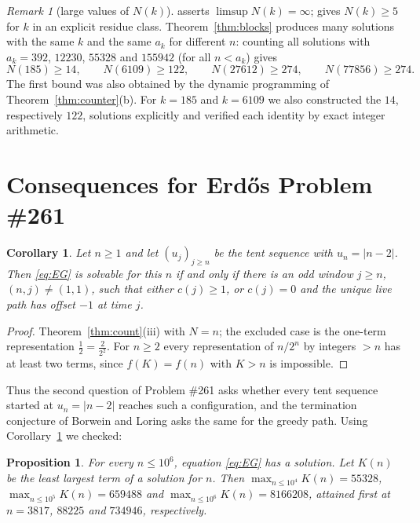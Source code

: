 \documentclass[11pt]{amsart}
\newtheorem{proposition}[theorem]{Proposition}
\newtheorem{corollary}[theorem]{Corollary}
\theoremstyle{definition}
\theoremstyle{remark}
\newtheorem{remark}[theorem]{Remark}
\begin{document}
\begin{remark}[large values of $N(k)$]
\cite[Conj.~3.3]{TUZ} asserts $\limsup N(k)=\infty$; \cite[Prop.~3.1]{TUZ} gives $N(k)\ge5$ for $k$ in an explicit residue class. Theorem~\ref{thm:blocks} produces many solutions with the same $k$ and the same $a_k$ for different $n$: counting all solutions with $a_k=392$, $12230$, $55328$ and $155942$ (for all $n<a_k$) gives
\[
N(185)\ge14,\qquad N(6109)\ge122,\qquad N(27612)\ge274,\qquad N(77856)\ge274 .
\]
The first bound was also obtained by the dynamic programming of Theorem~\ref{thm:counter}(b). For $k=185$ and $k=6109$ we also constructed the $14$, respectively $122$, solutions explicitly and verified each identity by exact integer arithmetic.
\end{remark}

\section{Consequences for Erd\H{o}s Problem \texorpdfstring{\#261}{261}}\label{sec:261}

\begin{corollary}\label{cor:ii}
Let $n\ge1$ and let $(u_j)_{j\ge n}$ be the tent sequence with $u_n=|n-2|$. Then \eqref{eq:EG} is solvable for this $n$ if and only if there is an odd window $j\ge n$, $(n,j)\ne(1,1)$, such that either $c(j)\ge1$, or $c(j)=0$ and the unique live path has offset $-1$ at time $j$.
\end{corollary}

\begin{proof}
Theorem~\ref{thm:count}(iii) with $N=n$; the excluded case is the one-term representation $\frac12=\frac{2}{2^2}$. For $n\ge2$ every representation of $n/2^n$ by integers $>n$ has at least two terms, since $f(K)=f(n)$ with $K>n$ is impossible.
\end{proof}

Thus the second question of Problem \#261 asks whether every tent sequence started at $u_n=|n-2|$ reaches such a configuration, and the termination conjecture of Borwein and Loring asks the same for the greedy path. Using Corollary~\ref{cor:ii} we checked:

\begin{proposition}\label{prop:ii}
For every $n\le10^6$, equation \eqref{eq:EG} has a solution. Let $K(n)$ be the least largest term of a solution for $n$. Then $\max_{n\le10^4}K(n)=55328$, $\max_{n\le10^5}K(n)=659488$ and $\max_{n\le10^6}K(n)=8166208$, attained first at $n=3817$, $88225$ and $734946$, respectively.
\end{proposition}
\end{document}
